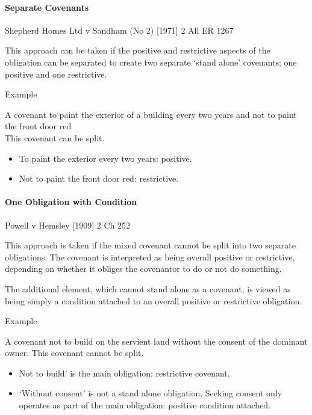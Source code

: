 \documentclass[
]{article}
\providecommand{\tightlist}{%
  \setlength{\itemsep}{0pt}\setlength{\parskip}{0pt}}
\newenvironment{env-de3101d4-f08b-48eb-bc0e-2fa06f3bcf8e}
{
    \savenotes\tcolorbox[blanker,breakable,left=5pt,borderline west={2pt}{-4pt}{purple}]
}
{
    \endtcolorbox\spewnotes
}
\begin{document}
\hypertarget{separate-covenants}{%
\paragraph{Separate Covenants}\label{separate-covenants}}

Shepherd Homes Ltd v Sandham (No 2) {[}1971{]} 2 All ER 1267

This approach can be taken if the positive and restrictive aspects of
the obligation can be separated to create two separate `stand alone'
covenants; one positive and one restrictive.

\begin{env-de3101d4-f08b-48eb-bc0e-2fa06f3bcf8e}

Example

A covenant to paint the exterior of a building every two years and not
to paint the front door red\\
This covenant can be split.

\begin{itemize}
\tightlist
\item
  To paint the exterior every two years: positive.
\item
  Not to paint the front door red: restrictive.
\end{itemize}

\end{env-de3101d4-f08b-48eb-bc0e-2fa06f3bcf8e}

\hypertarget{one-obligation-with-condition}{%
\paragraph{One Obligation with
Condition}\label{one-obligation-with-condition}}

Powell v Hemsley {[}1909{]} 2 Ch 252

This approach is taken if the mixed covenant cannot be split into two
separate obligations. The covenant is interpreted as being overall
positive or restrictive, depending on whether it obliges the covenantor
to do or not do something.

The additional element, which cannot stand alone as a covenant, is
viewed as being simply a condition attached to an overall positive or
restrictive obligation.

\begin{env-de3101d4-f08b-48eb-bc0e-2fa06f3bcf8e}

Example

A covenant not to build on the servient land without the consent of the
dominant owner. This covenant cannot be split.

\begin{itemize}
\tightlist
\item
  Not to build' is the main obligation: restrictive covenant.
\item
  `Without consent' is not a stand alone obligation. Seeking consent
  only operates as part of the main obligation: positive condition
  attached.
\end{itemize}

\end{env-de3101d4-f08b-48eb-bc0e-2fa06f3bcf8e}
\end{document}
